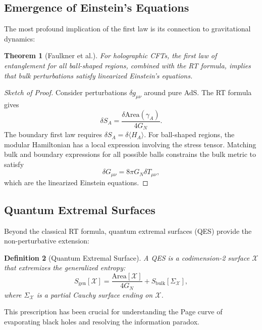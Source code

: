 \documentclass[11pt,letterpaper]{article}
\newtheorem{theorem}{Theorem}[section]
\newtheorem{definition}[theorem]{Definition}
\begin{document}
\subsection{Emergence of Einstein's Equations}

The most profound implication of the first law is its connection to gravitational dynamics:

\begin{theorem}[Faulkner et al.]
For holographic CFTs, the first law of entanglement for all ball-shaped regions, combined with the RT formula, implies that bulk perturbations satisfy linearized Einstein's equations.
\end{theorem}

\begin{proof}[Sketch of Proof]
Consider perturbations $\delta g_{\mu\nu}$ around pure AdS. The RT formula gives
\begin{equation}
\delta S_A = \frac{\delta \text{Area}(\gamma_A)}{4G_N}.
\end{equation}
The boundary first law requires $\delta S_A = \delta\langle H_A\rangle$. For ball-shaped regions, the modular Hamiltonian has a local expression involving the stress tensor. Matching bulk and boundary expressions for all possible balls constrains the bulk metric to satisfy
\begin{equation}
\delta G_{\mu\nu} = 8\pi G_N \delta T_{\mu\nu},
\end{equation}
which are the linearized Einstein equations.
\end{proof}

\subsection{Quantum Extremal Surfaces}

Beyond the classical RT formula, quantum extremal surfaces (QES) provide the non-perturbative extension:

\begin{definition}[Quantum Extremal Surface]
A QES is a codimension-2 surface $\mathcal{X}$ that extremizes the generalized entropy:
\begin{equation}
S_{\text{gen}}[\mathcal{X}] = \frac{\text{Area}[\mathcal{X}]}{4G_N} + S_{\text{bulk}}[\Sigma_\mathcal{X}],
\end{equation}
where $\Sigma_\mathcal{X}$ is a partial Cauchy surface ending on $\mathcal{X}$.
\end{definition}

This prescription has been crucial for understanding the Page curve of evaporating black holes and resolving the information paradox.
\end{document}
